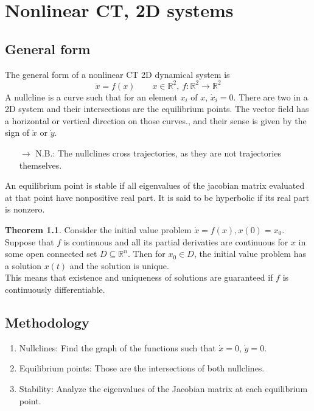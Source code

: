 \documentclass[12pt, openany]{report}
\theoremstyle{definition}
\newtheorem{thm}{Theorem}[chapter]
\newcommand{\R}{\mathbb{R}}
\begin{document}
\chapter{Nonlinear CT, 2D systems}
\section{General form}
The general form of a nonlinear CT 2D dynamical system is 
\begin{equation}
    \dot x = f(x)\qquad x\in \R^2, \: f:\R^2\rightarrow \R^2
\end{equation}
A nullcline is a curve such that for an element \(x_i\) of \(x\), \(\dot x_i=0\). There are two in a 2D system and their intersections are the equilibrium points. The vector field has a horizontal or vertical direction on those curves., and their sense is given by the sign of \(\dot x\) or \(\dot y\).
\begin{itemize}
    \item [\(\rightarrow\)] N.B.: The nullclines cross trajectories, as they are not trajectories themselves. 
\end{itemize}
An equilibrium point is stable if all eigenvalues of the jacobian matrix evaluated at that point have nonpositive real part. It is said to be hyperbolic if its real part is nonzero. 
\begin{thm}
    Consider the initial value problem \(\dot x=f(x),x(0)=x_0\). Suppose that \(f\) is continuous and all its partial derivaties are continuous for \(x\) in some open connected set \(D\subseteq \R^n\). Then for \(x_0\in D\), the initial value problem has a solution \(x(t)\) and the solution is unique. \\
    This means that existence and uniqueness of solutions are guaranteed if \(f\) is continuously differentiable.
\end{thm}
\section{Methodology}
\begin{enumerate}
    \item Nullclines: Find the graph of the functions such that \(\dot x=0\), \(\dot y=0\).
    \item Equilibrium points: Those are the intersections of both nullclines.
    \item Stability: Analyze the eigenvalues of the Jacobian matrix at each equilibrium point.
\end{enumerate}
\end{document}
